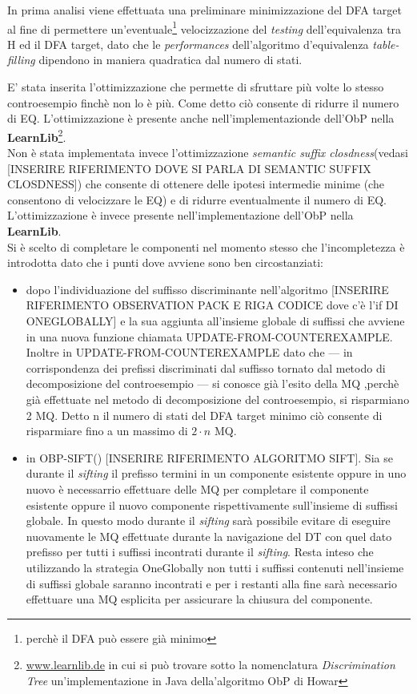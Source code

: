In prima analisi viene effettuata una preliminare minimizzazione del \ac{DFA} target al fine di permettere un'eventuale\footnote{perchè il \ac{DFA} può essere già minimo} velocizzazione del \textit{testing} dell'equivalenza tra \ac{H} ed il \ac{DFA} target, dato che le \textit{performances} dell'algoritmo d'equivalenza \textit{table-filling} dipendono in maniera quadratica dal numero di stati.

E' stata inserita l'ottimizzazione che permette di sfruttare più volte lo stesso controesempio finchè non lo è più. Come detto ciò consente di ridurre il numero di \ac{EQ}. L'ottimizzazione è presente anche nell'implementazionde dell'\ac{ObP} nella \textbf{LearnLib}\footnote{\url{www.learnlib.de} in cui si può trovare sotto la nomenclatura \textit{Discrimination Tree} un'implementazione in Java della'algoritmo \ac{ObP} di Howar}.\\
Non è stata implementata invece l'ottimizzazione \textit{semantic suffix closdness}(vedasi [INSERIRE RIFERIMENTO DOVE SI PARLA DI SEMANTIC SUFFIX CLOSDNESS]) che consente di ottenere delle ipotesi intermedie minime (che consentono di velocizzare le \ac{EQ}) e di ridurre eventualmente il numero  di \ac{EQ}. L'ottimizzazione è invece presente nell'implementazione  dell'\ac{ObP} nella \textbf{LearnLib}.\\
Si è scelto di completare le componenti nel momento stesso che l'incompletezza è introdotta dato che i punti dove avviene sono ben circostanziati:
\begin{itemize} 
\item dopo l'individuazione del suffisso discriminante nell'algoritmo [INSERIRE RIFERIMENTO OBSERVATION PACK E RIGA CODICE dove c'è l'if DI ONEGLOBALLY] e la sua aggiunta all'insieme globale di suffissi che avviene in una nuova funzione chiamata UPDATE-FROM-COUNTEREXAMPLE. Inoltre in UPDATE-FROM-COUNTEREXAMPLE  dato che --- in corrispondenza dei prefissi discriminati dal suffisso tornato dal metodo di decomposizione del controesempio --- si conosce già l'esito della \ac{MQ} ,perchè già effettuate nel metodo di decomposizione del controesempio, si risparmiano 2 \ac{MQ}. Detto n il numero di stati del \ac{DFA} target minimo ciò consente di risparmiare fino a un massimo di $2\cdot n$ \ac{MQ}.
 \item in OBP-SIFT() [INSERIRE RIFERIMENTO ALGORITMO SIFT]. Sia se durante il \textit{sifting} il prefisso termini in un componente esistente oppure in uno nuovo è necessarrio effettuare delle \ac{MQ} per completare il componente esistente oppure il nuovo componente rispettivamente sull'insieme di suffissi globale.  In questo modo durante il \textit{sifting} sarà possibile evitare di eseguire nuovamente le \ac{MQ} effettuate durante la navigazione del \ac{DT} con quel dato prefisso per tutti i suffissi incontrati durante il \textit{sifting}. Resta inteso che utilizzando la strategia OneGlobally non tutti i suffissi contenuti nell'insieme di suffissi globale saranno incontrati e per i restanti alla fine sarà necessario effettuare una \ac{MQ} esplicita per assicurare la chiusura del componente. 
\end{itemize}
